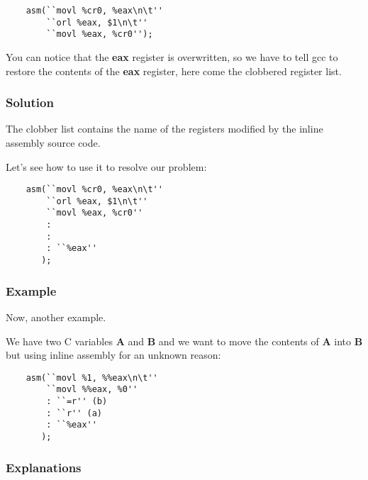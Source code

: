 {\begin{frame}[containsverbatim]
  \begin{verbatim}
    asm(``movl %cr0, %eax\n\t''
        ``orl %eax, $1\n\t''
        ``movl %eax, %cr0'');
  \end{verbatim}

  You can notice that the \textbf{eax} register is overwritten, so
  we have to tell gcc to restore the contents of the \textbf{eax} register,
  here come the clobbered register list.
\end{frame}


\begin{frame}[containsverbatim]
  \frametitle{Solution}

  The clobber list contains the name of the registers modified by the
  inline assembly source code.

  \nl

  Let's see how to use it to resolve our problem:

  \begin{verbatim}
    asm(``movl %cr0, %eax\n\t''
        ``orl %eax, $1\n\t''
        ``movl %eax, %cr0''
        :
        :
        : ``%eax''
       );
  \end{verbatim}
\end{frame}


\begin{frame}[containsverbatim]
  \frametitle{Example}

  Now, another example.

  \nl

  We have two C variables \textbf{A} and \textbf{B} and we want to
  move the contents of \textbf{A} into \textbf{B} but using inline
  assembly for an unknown reason:

  \begin{verbatim}
    asm(``movl %1, %%eax\n\t''
        ``movl %%eax, %0''
        : ``=r'' (b)
        : ``r'' (a)
        : ``%eax''
       );
    \end{verbatim}
\end{frame}


\begin{frame}
  \frametitle{Explanations}


\end{frame}}
